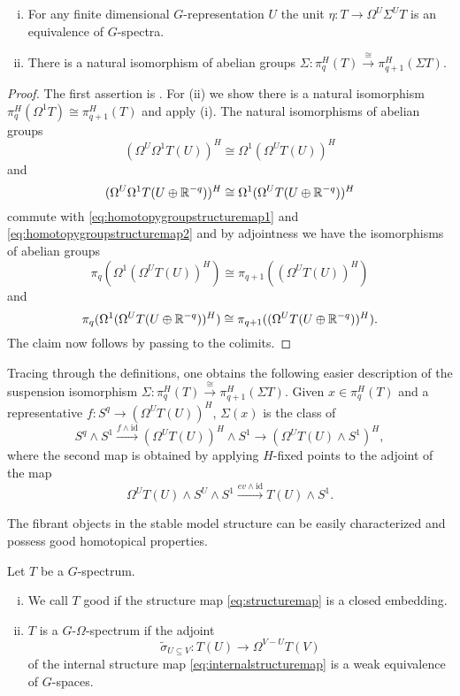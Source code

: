 \begin{lem}\label{lem:spectrumsuspensionshift}
\begin{enumerate}[(i)]
\item For any finite dimensional $G$-representation $U$
the unit $\eta:T\to \Omega^U\Sigma^UT$ is an equivalence
of $G$-spectra.
\item There is a natural isomorphism of abelian groups $\Sigma:\pi_{q}^H(T)\xrightarrow{\cong} \pi^H_{q+1}(\Sigma T) $.
\end{enumerate}
\end{lem}
\begin{proof}
The first assertion is \cite[Lemma~3.8, \pno~46]{mandellmay}. For (ii)
we show there is a natural isomorphism $\pi_q^H(\Omega^1 T)\cong \pi_{q+1}^H(T)$
and apply (i). The natural isomorphisms of abelian groups
\[
(\Omega^U\Omega^1T(U))^H\cong\Omega^1(\Omega^UT(U))^H
\]
and 
\[
(\Omega^U\Omega^1T(U\oplus \mathbb{R}^{-q}))^H\cong\Omega^1(\Omega^UT(U\oplus\mathbb{R}^{-q}))^H
\]
commute with \eqref{eq:homotopygroupstructuremap1} and  \eqref{eq:homotopygroupstructuremap2} 
and by adjointness we have the isomorphisms of abelian groups
\[
\pi_q(\Omega^1(\Omega^UT(U))^H)\cong \pi_{q+1}((\Omega^UT(U))^H)
\]
and
\[
\pi_q(\Omega^1(\Omega^UT(U\oplus\mathbb{R}^{-q}))^H)\cong \pi_{q+1}((\Omega^UT(U\oplus\mathbb{R}^{-q}))^H).
\]
The claim now follows by passing to the colimits.
\end{proof}
\begin{rem}\label{rem:spectrumsuspensionshift}
Tracing through the definitions, one obtains the following easier description
of the suspension isomorphism $\Sigma:\pi_{q}^H(T)\xrightarrow{\cong} \pi^H_{q+1}(\Sigma T) $.
Given $x\in \pi_q^H(T)$ and a representative
$f:S^q\to (\Omega^UT(U))^H$, $\Sigma (x)$ is the class of
\[
S^q\wedge S^1\xrightarrow{f\wedge \mathrm{id}}(\Omega^UT(U))^H\wedge S^1
\to (\Omega^UT(U)\wedge S^1)^H, 
\]
where the second map is obtained by applying $H$-fixed points to the adjoint of
the map
\[
\Omega^UT(U)\wedge S^U\wedge S^1\xrightarrow{ev\wedge \mathrm{id}} T(U)\wedge S^1.
\]
\end{rem}
The fibrant objects in the stable model structure can be easily
characterized and possess good homotopical properties.
\begin{mydef}
Let $T$ be a $G$-spectrum.
\begin{enumerate}[(i)]
\item We call $T$ good if the structure map \eqref{eq:structuremap}
is a closed embedding.
\item $T$ is a $G$-$\Omega$-spectrum if the adjoint
\begin{equation}
\tilde \sigma_{U\subseteq V}: T(U)\to \Omega^{V-U}T(V)\label{eq:adjointinternalstructuremap}
\end{equation}
of the internal structure map \eqref{eq:internalstructuremap} is
a weak equivalence of $G$-spaces.
\end{enumerate}
\end{mydef}

